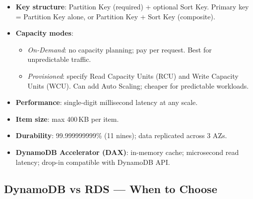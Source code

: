 

\begin{keyfacts}
\begin{itemize}
  \item \textbf{Key structure}: Partition Key (required) + optional Sort Key.
        Primary key = Partition Key alone, or Partition Key + Sort Key (composite).
  \item \textbf{Capacity modes}:
    \begin{itemize}
      \item \emph{On-Demand}: no capacity planning; pay per request. Best for unpredictable traffic.
      \item \emph{Provisioned}: specify Read Capacity Units (RCU) and Write Capacity Units (WCU).
            Can add Auto Scaling; cheaper for predictable workloads.
    \end{itemize}
  \item \textbf{Performance}: single-digit millisecond latency at any scale.
  \item \textbf{Item size}: max 400\,KB per item.
  \item \textbf{Durability}: 99.999999999\% (11 nines); data replicated across 3 AZs.
  \item \textbf{DynamoDB Accelerator (DAX)}: in-memory cache; microsecond read latency;
        drop-in compatible with DynamoDB API.
\end{itemize}
\end{keyfacts}

\subsection{DynamoDB vs RDS --- When to Choose}

